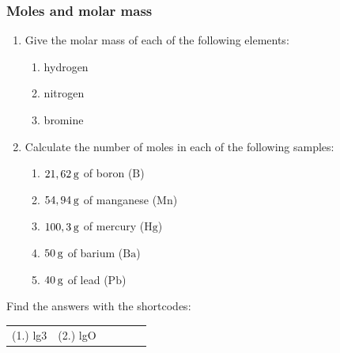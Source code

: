             \subsubsection{  Moles and molar mass
      }
            \nopagebreak
      \label{m38717*id277281}\begin{enumerate}[noitemsep, label=\textbf{\arabic*}. ] 
            \label{m38717*uid14}\item Give the molar mass of each of the following elements:
\label{m38717*id277295}\begin{enumerate}[noitemsep, label=\textbf{\alph*}. ] 
            \label{m38717*uid15}\item hydrogen
\label{m38717*uid16}\item nitrogen
\label{m38717*uid17}\item bromine
\end{enumerate}
                \label{m38717*uid18}\item Calculate the number of moles in each of the following samples:
\label{m38717*id277346}\begin{enumerate}[noitemsep, label=\textbf{\alph*}. ] 
            \label{m38717*uid19}\item $21,62\phantom{\rule{2pt}{0ex}}\mathrm{g}$ of boron ($\mathrm{B}$)
\label{m38717*uid20}\item $54,94\phantom{\rule{2pt}{0ex}}\mathrm{g}$ of manganese ($\mathrm{Mn}$)
\label{m38717*uid21}\item $100,3\phantom{\rule{2pt}{0ex}}\mathrm{g}$ of mercury ($\mathrm{Hg}$)
\label{m38717*uid22}\item $50\phantom{\rule{2pt}{0ex}}\mathrm{g}$ of barium ($\mathrm{Ba}$)
\label{m38717*uid23}\item $40\phantom{\rule{2pt}{0ex}}\mathrm{g}$ of lead ($\mathrm{Pb}$)
\end{enumerate}
                \end{enumerate}
    \label{m38717*cid4}
\par {} Find the answers with the shortcodes:
 \par \begin{tabular}[h]{cccccc}
 (1.) lg3  &  (2.) lgO  & \end{tabular}
